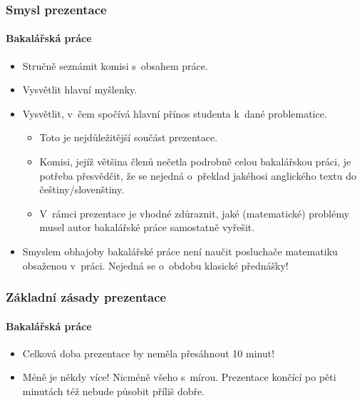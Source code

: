 \documentclass[c, 10pt]{beamer}
\begin{document}
\begin{frame}\frametitle{Smysl prezentace}
\framesubtitle{Bakalářská práce}

\begin{itemize}\itemsep=1em
\item Stručně seznámit komisi s~obsahem práce.
\item Vysvětlit \alert{hlavní} myšlenky.
\item Vysvětlit, v~čem spočívá \alert{hlavní přínos studenta} k~dané problematice.
  \begin{itemize}\color{colTwo}\itemsep=1ex
  \item Toto je nejdůležitější součást prezentace.
  \item Komisi, jejíž většina členů nečetla podrobně celou bakalářskou práci,
    je potřeba přesvědčit, že se nejedná o~překlad jakéhosi anglického textu 
    do češtiny/slovenštiny.
  \item V~rámci prezentace je vhodné zdůraznit, jaké (matematické) problémy musel
    autor bakalářské práce samostatně vyřešit.
  \end{itemize}
\item Smyslem obhajoby bakalářské práce \alert{není} naučit posluchače 
  matematiku obsaženou v~práci. Nejedná se o~obdobu klasické přednášky!
\end{itemize}
\end{frame}

\begin{frame}\frametitle{Základní zásady prezentace}
\framesubtitle{Bakalářská práce}

\begin{itemize}\itemsep=1em
\item Celková doba prezentace by neměla přesáhnout \alert{10 minut!}
\item Méně je někdy více! Nicméně všeho s~mírou. Prezentace končící po pěti minutách též nebude působit příliš dobře.
\end{itemize}
\end{frame}
\end{document}
